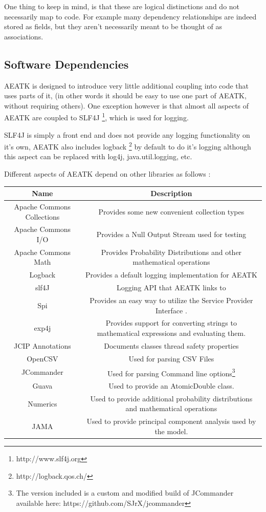 \documentclass[11pt,letterpaper,oneside]{article}
\begin{document}
\vspace{5pt}
One thing to keep in mind, is that these are logical distinctions and do not necessarily map to code. For example many dependency relationships are indeed stored as fields, but they aren't necessarily meant to be thought of as associations.

\subsection{Software Dependencies}

AEATK is designed to introduce very little additional coupling into code that uses parts of it, (in other words it should be easy to use one part of AEATK, without requiring others). One exception however is that almost all aspects of AEATK are coupled to SLF4J \footnote{http://www.slf4j.org}, which is used for logging.

SLF4J is simply a front end and does not provide any logging functionality on it's own, AEATK also includes logback \footnote{http://logback.qos.ch/} by default to do it's logging although this aspect can be replaced with log4j, java.util.logging, etc.


Different aspects of AEATK depend on other libraries as follows :
\\

\begin{minipage}{12cm}
\begin{tabular}{c c }
Name & Description  \\

\hline
\hline
Apache Commons Collections & Provides some new convenient collection types \\
Apache Commons I/O & Provides a Null Output Stream used for testing \\
Apache Commons Math & Provides Probability Distributions and other mathematical operations \\
Logback & 	Provides a default logging implementation for AEATK \\
slf4J & Logging API that AEATK links to \\
Spi & Provides an easy way to utilize the Service Provider Interface . \\
exp4j & Provides support for converting strings to mathematical expressions and evaluating them. \\
JCIP Annotations & Documents classes thread safety properties \\
OpenCSV & Used for parsing CSV Files \\
JCommander & Used for parsing Command line options\footnote{The version included is a custom and modified build of JCommander available here: https://github.com/SJrX/jcommander} \\
Guava & Used to provide an AtomicDouble class. \\ 
Numerics & Used to provide additional probability distributions and mathematical operations \\
JAMA & Used to provide principal component analysis used by the model. \\


\end{tabular}
\end{minipage}
\end{document}
